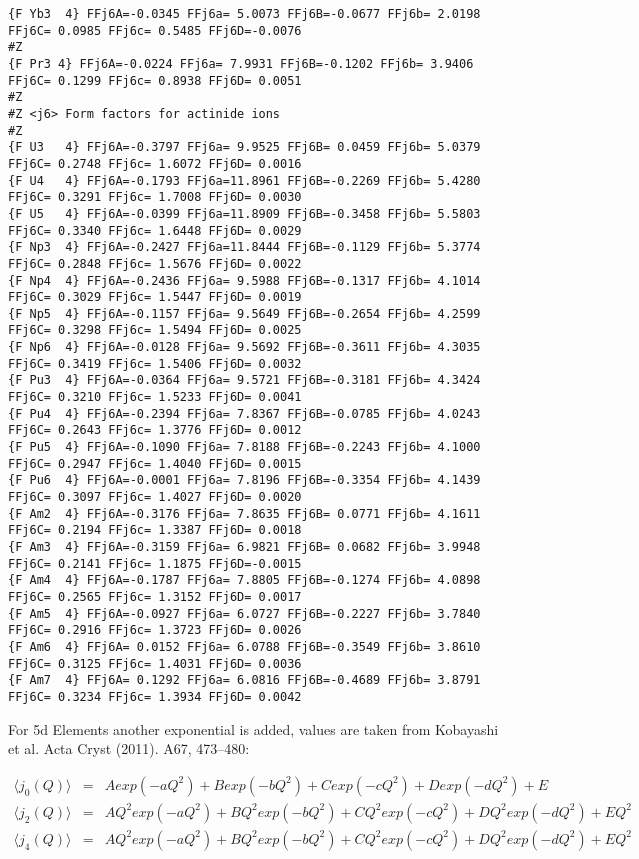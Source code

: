 {\begin{verbatim}
{F Yb3  4} FFj6A=-0.0345 FFj6a= 5.0073 FFj6B=-0.0677 FFj6b= 2.0198 FFj6C= 0.0985 FFj6c= 0.5485 FFj6D=-0.0076 
#Z
{F Pr3 4} FFj6A=-0.0224 FFj6a= 7.9931 FFj6B=-0.1202 FFj6b= 3.9406 FFj6C= 0.1299 FFj6c= 0.8938 FFj6D= 0.0051 
#Z
#Z <j6> Form factors for actinide ions
#Z
{F U3   4} FFj6A=-0.3797 FFj6a= 9.9525 FFj6B= 0.0459 FFj6b= 5.0379 FFj6C= 0.2748 FFj6c= 1.6072 FFj6D= 0.0016 
{F U4   4} FFj6A=-0.1793 FFj6a=11.8961 FFj6B=-0.2269 FFj6b= 5.4280 FFj6C= 0.3291 FFj6c= 1.7008 FFj6D= 0.0030 
{F U5   4} FFj6A=-0.0399 FFj6a=11.8909 FFj6B=-0.3458 FFj6b= 5.5803 FFj6C= 0.3340 FFj6c= 1.6448 FFj6D= 0.0029 
{F Np3  4} FFj6A=-0.2427 FFj6a=11.8444 FFj6B=-0.1129 FFj6b= 5.3774 FFj6C= 0.2848 FFj6c= 1.5676 FFj6D= 0.0022 
{F Np4  4} FFj6A=-0.2436 FFj6a= 9.5988 FFj6B=-0.1317 FFj6b= 4.1014 FFj6C= 0.3029 FFj6c= 1.5447 FFj6D= 0.0019 
{F Np5  4} FFj6A=-0.1157 FFj6a= 9.5649 FFj6B=-0.2654 FFj6b= 4.2599 FFj6C= 0.3298 FFj6c= 1.5494 FFj6D= 0.0025 
{F Np6  4} FFj6A=-0.0128 FFj6a= 9.5692 FFj6B=-0.3611 FFj6b= 4.3035 FFj6C= 0.3419 FFj6c= 1.5406 FFj6D= 0.0032 
{F Pu3  4} FFj6A=-0.0364 FFj6a= 9.5721 FFj6B=-0.3181 FFj6b= 4.3424 FFj6C= 0.3210 FFj6c= 1.5233 FFj6D= 0.0041 
{F Pu4  4} FFj6A=-0.2394 FFj6a= 7.8367 FFj6B=-0.0785 FFj6b= 4.0243 FFj6C= 0.2643 FFj6c= 1.3776 FFj6D= 0.0012 
{F Pu5  4} FFj6A=-0.1090 FFj6a= 7.8188 FFj6B=-0.2243 FFj6b= 4.1000 FFj6C= 0.2947 FFj6c= 1.4040 FFj6D= 0.0015 
{F Pu6  4} FFj6A=-0.0001 FFj6a= 7.8196 FFj6B=-0.3354 FFj6b= 4.1439 FFj6C= 0.3097 FFj6c= 1.4027 FFj6D= 0.0020 
{F Am2  4} FFj6A=-0.3176 FFj6a= 7.8635 FFj6B= 0.0771 FFj6b= 4.1611 FFj6C= 0.2194 FFj6c= 1.3387 FFj6D= 0.0018 
{F Am3  4} FFj6A=-0.3159 FFj6a= 6.9821 FFj6B= 0.0682 FFj6b= 3.9948 FFj6C= 0.2141 FFj6c= 1.1875 FFj6D=-0.0015 
{F Am4  4} FFj6A=-0.1787 FFj6a= 7.8805 FFj6B=-0.1274 FFj6b= 4.0898 FFj6C= 0.2565 FFj6c= 1.3152 FFj6D= 0.0017 
{F Am5  4} FFj6A=-0.0927 FFj6a= 6.0727 FFj6B=-0.2227 FFj6b= 3.7840 FFj6C= 0.2916 FFj6c= 1.3723 FFj6D= 0.0026 
{F Am6  4} FFj6A= 0.0152 FFj6a= 6.0788 FFj6B=-0.3549 FFj6b= 3.8610 FFj6C= 0.3125 FFj6c= 1.4031 FFj6D= 0.0036 
{F Am7  4} FFj6A= 0.1292 FFj6a= 6.0816 FFj6B=-0.4689 FFj6b= 3.8791 FFj6C= 0.3234 FFj6c= 1.3934 FFj6D= 0.0042 

\end{verbatim}
}

For 5d Elements another exponential is added, values are taken from Kobayashi et al.
Acta Cryst (2011). A67, 473–480:

\begin{eqnarray}
\langle j_0(Q) \rangle&=&A exp(-aQ^2)+B exp(-bQ^2)+C exp(-cQ^2)+D exp(-dQ^2)+E \\
\langle j_2(Q) \rangle&=&A Q^2 exp(-aQ^2)+B Q^2 exp(-bQ^2)+C Q^2 exp(-cQ^2)+D Q^2 exp(-dQ^2)+ E Q^2 \\
\langle j_4(Q) \rangle&=&A Q^2 exp(-aQ^2)+B Q^2 exp(-bQ^2)+C Q^2 exp(-cQ^2)+D Q^2 exp(-dQ^2)+ E Q^2 
\end{eqnarray}

